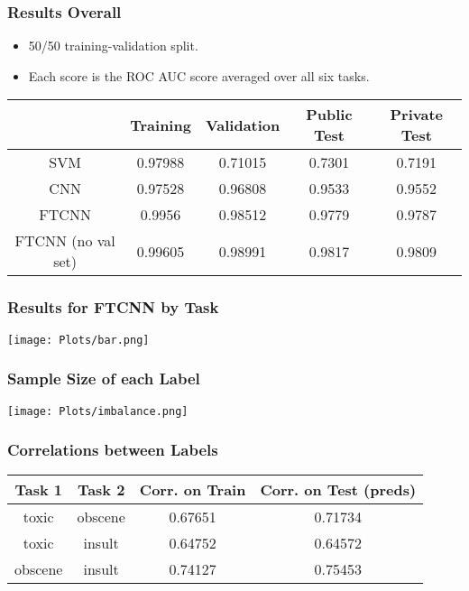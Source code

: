 \documentclass{beamer}
\begin{document}
\begin{frame}
\frametitle{Results Overall}
\begin{itemize}
\item 50/50 training-validation split.
\item Each score is the ROC AUC score averaged over all six tasks.
\end{itemize}
\begin{center}
\begin{tabular}{|c|c|c|c|c|} \hline
\quad & Training & Validation & Public Test & Private Test \\ \hline
SVM & 0.97988 & 0.71015 & 0.7301 & 0.7191 \\
CNN & 0.97528 & 0.96808 & 0.9533 & 0.9552 \\
FTCNN & 0.9956 & 0.98512 & 0.9779 & 0.9787 \\ \hline
FTCNN (no val set) & 0.99605 & 0.98991 & 0.9817 & 0.9809 \\
\hline
\end{tabular}
\end{center}
\end{frame}

\begin{frame}
\frametitle{Results for FTCNN by Task}
\begin{center}
\texttt{[image: Plots/bar.png]}
\end{center}
\end{frame}

\begin{frame}
\frametitle{Sample Size of each Label}
\begin{center}
\texttt{[image: Plots/imbalance.png]}
\end{center}
\end{frame}

\begin{frame}
\frametitle{Correlations between Labels}
\begin{center}
\begin{tabular}{|c|c|c|c|} \hline
Task 1 & Task 2 & Corr. on Train & Corr. on Test (preds) \\ \hline
toxic & obscene & 0.67651 & 0.71734 \\
toxic & insult & 0.64752 & 0.64572 \\
obscene & insult & 0.74127 & 0.75453 \\
\hline
\end{tabular}
\end{center}
\end{frame}
\end{document}

